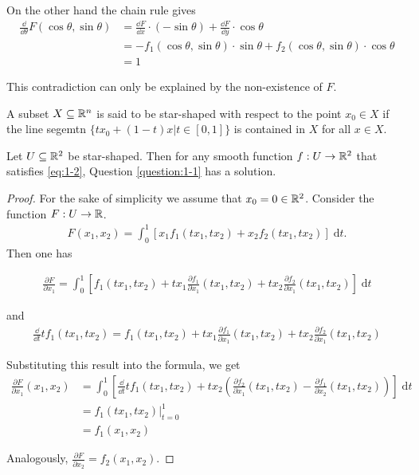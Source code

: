 On the other hand the chain rule gives
\begin{align*}
  \frac{\dd }{\dd\theta} F(\cos\theta, \sin\theta) 
  & = \frac{\dd F}{\dd x}\cdot (-\sin\theta) + \frac{\dd F}{\dd y}\cdot \cos\theta \\
  & = -f_1 (\cos\theta, \sin\theta)\cdot\sin\theta + f_2(\cos\theta, \sin\theta)\cdot \cos\theta\\
  & = 1
\end{align*}

This contradiction can only be explained by the non-existence of $F$.

\begin{definition}
  A subset $X\subseteq \mathbb{R}^n$ is said to be star-shaped with respect to the point $x_0\in X$ if
  the line segemtn $\{tx_0+(1-t)x|t\in[0,1]\}$ is contained in $X$ for all $x\in X$.
\end{definition}

\begin{theorem}\label{theorem:1-4}
  Let $U\subseteq \mathbb{R}^2$ be star-shaped. Then for any smooth function $f:U\to \mathbb{R}^2$ that satisfies
  \eqref{eq:1-2}, Question \ref{question:1-1} has a solution.
\end{theorem}

\begin{proof}
  For the sake of simplicity we assume that $x_0=0\in\mathbb{R}^2$. Consider the function $F:U\to \mathbb{R}$.
  \begin{align*}
    F(x_1, x_2) = \int_{0}^{1}{\left[ x_1f_1(tx_1, tx_2) + x_2f_2(tx_1, tx_2) \right] \;\mathrm{d}t}.
  \end{align*}
Then one has

\begin{align*}
  \frac{\partial F}{\partial x_1} 
  = \int_{0}^{1}{\left[ f_1(tx_1, tx_2) + tx_1\frac{\partial f_1}{\partial x_1}(tx_1, tx_2) + tx_2\frac{\partial f_2}{\partial x_1}(tx_1, tx_2) \right] \;\mathrm{d}t}
\end{align*}

and 
\begin{align*}
  \frac{\dd }{\dd t} tf_1(tx_1, tx_2) 
  = f_1(tx_1, tx_2) + tx_1\frac{\partial f_1}{\partial x_1}(tx_1, tx_2) + tx_2\frac{\partial f_2}{\partial x_1}(tx_1, tx_2)
\end{align*}

Substituting this result into the formula, we get
\begin{align*}
  \frac{\partial F}{\partial x_1}(x_1, x_2)
  & = \int_{0}^{1}{\left[\frac{\dd }{\dd t}tf_1(tx_1, tx_2) + tx_2\left(\frac{\partial f_2}{\partial x_1}(tx_1, tx_2) - \frac{\partial f_1}{\partial x_2}(tx_1, tx_2) \right)\right] \;\mathrm{d}t}\\
  & = f_1(tx_1, tx_2)\big|_{t=0}^1\\
  & = f_1(x_1, x_2)
\end{align*}

Analogously, $\frac{\partial F }{\partial x_2} = f_2(x_1, x_2)$.
\end{proof}

